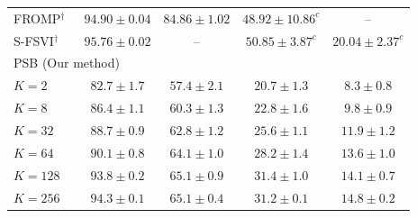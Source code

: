 \begin{table}[t]
\begin{tabular*}{\textwidth}{@{\extracolsep{\fill}}lcccc@{}}
  FROMP$^\dagger$~\cite{pan2020fromp,rudner2022sfsvi,vandeven2022types,kessler2023sequential}
      & $94.90\pm0.04$ & $84.86\pm1.02$
      & $48.92\pm10.86^{c}$ & -- \\
  S-FSVI$^\dagger$~\cite{rudner2022sfsvi,kessler2023sequential}
      & $95.76\pm0.02$ & --
      & $50.85\pm3.87^{c}$ & $20.04\pm2.37^{c}$ \\
  \hline
  \multicolumn{5}{l}{PSB (Our method)} \\
  $K=2$   & $82.7\pm1.7$ & $57.4\pm2.1$
          & $20.7\pm1.3$ & $8.3\pm0.8$ \\
  $K=8$   & $86.4\pm1.1$ & $60.3\pm1.3$
          & $22.8\pm1.6$ & $9.8\pm0.9$ \\
  $K=32$  & $88.7\pm0.9$ & $62.8\pm1.2$
          & $25.6\pm1.1$ & $11.9\pm1.2$ \\
  $K=64$  & $90.1\pm0.8$ & $64.1\pm1.0$
          & $28.2\pm1.4$ & $13.6\pm1.0$ \\
  $K=128$ & $93.8\pm0.2$ & $65.1\pm0.9$
          & $31.4\pm1.0$ & $14.1\pm0.7$ \\
  $K=256$ & $94.3\pm0.1$ & $65.1\pm0.4$
          & $31.2\pm0.1$ & $14.8\pm0.2$ \\
  \hline
  \end{tabular*}
\end{table}
